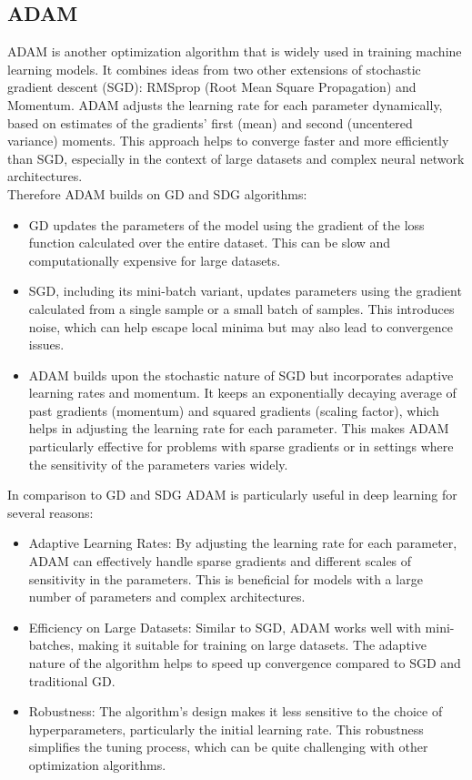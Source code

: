 \documentclass[oneside]{article}
\begin{document}
\subsection{ADAM}
ADAM is another optimization algorithm that is widely used in training machine learning models. It combines ideas from two other extensions of stochastic gradient descent (SGD): RMSprop (Root Mean Square Propagation) and Momentum. ADAM adjusts the learning rate for each parameter dynamically, based on estimates of the gradients' first (mean) and second (uncentered variance) moments. This approach helps to converge faster and more efficiently than SGD, especially in the context of large datasets and complex neural network architectures.\\
Therefore ADAM builds on GD and SDG algorithms:
\begin{itemize}
    \item GD updates the parameters of the model using the gradient of the loss function calculated over the entire dataset. This can be slow and computationally expensive for large datasets.
    \item SGD, including its mini-batch variant, updates parameters using the gradient calculated from a single sample or a small batch of samples. This introduces noise, which can help escape local minima but may also lead to convergence issues.
    \item ADAM builds upon the stochastic nature of SGD but incorporates adaptive learning rates and momentum. It keeps an exponentially decaying average of past gradients (momentum) and squared gradients (scaling factor), which helps in adjusting the learning rate for each parameter. This makes ADAM particularly effective for problems with sparse gradients or in settings where the sensitivity of the parameters varies widely.
\end{itemize}
 In comparison to GD and SDG ADAM is particularly useful in deep learning for several reasons:
\begin{itemize}
    \item Adaptive Learning Rates: By adjusting the learning rate for each parameter, ADAM can effectively handle sparse gradients and different scales of sensitivity in the parameters. This is beneficial for models with a large number of parameters and complex architectures.
    \item Efficiency on Large Datasets: Similar to SGD, ADAM works well with mini-batches, making it suitable for training on large datasets. The adaptive nature of the algorithm helps to speed up convergence compared to SGD and traditional GD.
    \item Robustness: The algorithm's design makes it less sensitive to the choice of hyperparameters, particularly the initial learning rate. This robustness simplifies the tuning process, which can be quite challenging with other optimization algorithms.
\end{itemize}
\end{document}
